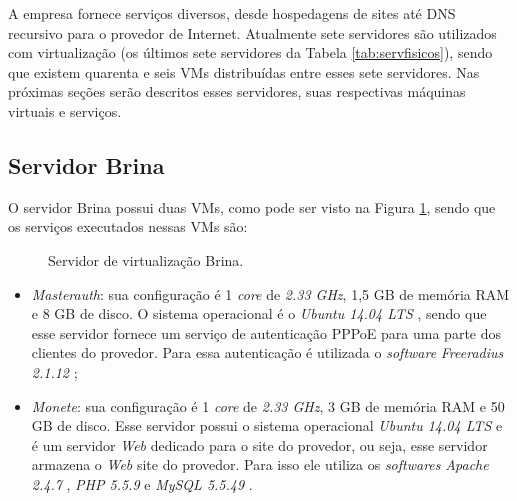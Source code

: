 A empresa fornece serviços diversos, desde hospedagens de sites até \ac{DNS} recursivo para o provedor de Internet. Atualmente sete servidores 
são utilizados com virtualização (os últimos sete servidores da Tabela \ref{tab:servfisicos}), sendo que existem quarenta e seis \ac{VM}s 
distribuídas entre esses sete servidores. Nas próximas seções serão descritos esses servidores, suas respectivas máquinas virtuais 
e serviços.

\subsection{Servidor Brina}
\label{section:serv_brina}

O servidor Brina possui duas \ac{VM}s, como pode ser visto na Figura \ref{fig:servidor_brina}, sendo que os serviços executados nessas \ac{VM}s
são:

\begin{figure}[h!]
 \centering
 \caption{Servidor de virtualização Brina.}
 \label{fig:servidor_brina}
\end{figure}

\begin{itemize}
 \item \textit{Masterauth}: sua configuração é 1 \textit{core} de \textit{2.33 GHz}, 1,5 GB de memória \ac{RAM} e 8 GB de disco. 
 O sistema operacional é o \textit{Ubuntu 14.04 \ac{LTS}} \cite{ubuntu}, sendo que esse servidor fornece um serviço de autenticação 
 \ac{PPPoE} \cite{javvin2005} para uma parte dos clientes do provedor. Para essa autenticação é utilizada o \textit{software} 
 \textit{Freeradius 2.1.12} \cite{freeradius};
 
 \item \textit{Monete}: sua configuração é 1 \textit{core} de \textit{2.33 GHz}, 3 GB de memória \ac{RAM} e 50 GB de disco. 
 Esse servidor possui o sistema operacional \textit{Ubuntu 14.04 \ac{LTS}} \cite{ubuntu} e é um servidor \textit{Web} dedicado para o site do 
 provedor, ou seja, esse servidor armazena o \textit{Web} site do provedor. Para isso ele utiliza os \textit{softwares} 
 \textit{Apache 2.4.7} \cite{apache}, \textit{\ac{PHP} 5.5.9} \cite{php} e \textit{MySQL 5.5.49} \cite{mysql}.
\end{itemize}

